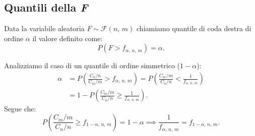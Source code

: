         \subsection{Quantili della \emph{F}}
            \begin{defn}
                Data la variabile aleatoria $F \sim \mathcal{F}(n,\,m)$ chiamiamo quantile di coda destra 
                di ordine $\alpha$ il valore definito come: \[
                    P(F > f_{\alpha,\,n,\,m}) = \alpha
                .\]
            \end{defn}
            \begin{obsv}
                Analizziamo il caso di un quantile di ordine simmetrico ($1-\alpha$):
                \begin{align*}
                    \alpha &= P\left(\frac{C_n /n}{C_m /m} > f_{\alpha,\,n,\,m}\right) =
                    P\left(\frac{C_m /m}{C_n /n} < \frac{1}{f_{\alpha,\,n,\,m}}\right) \\
                           &= 1 - P\left(\frac{C_m /m}{C_n /n} \geq \frac{1}{f_{\alpha,\,n,\,m}}\right)
                .\end{align*}
                Segue che:
                \begin{equation}\label{eq:Simmetria_quantile_distribuzione_F}
                    P\left(\frac{C_m /m}{C_n /n} \geq f_{1-\alpha,\,n,\,m}\right) = 1-\alpha \implies
                    \frac{1}{f_{\alpha,\,n,\,m}} = f_{1-\alpha,\,n,\,m}
                .\end{equation}
            \end{obsv}
